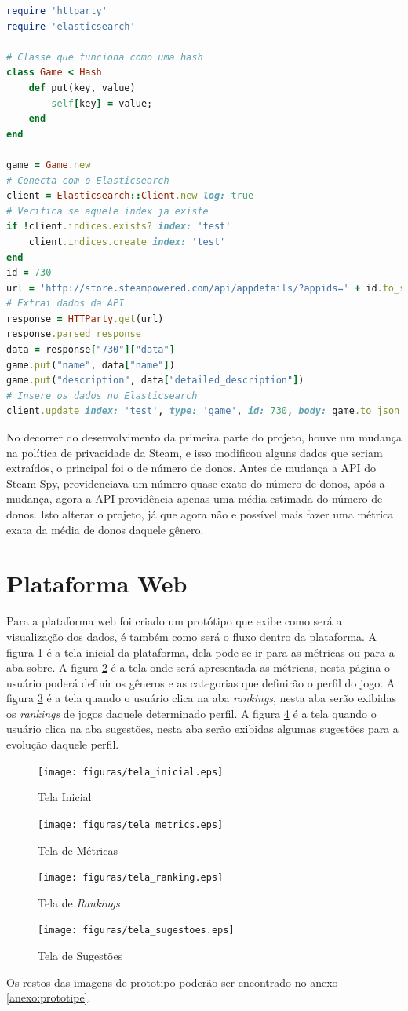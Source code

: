 \begin{lstlisting}[language={Ruby}, caption = {Código do \textit{Plugin}}, label = {code:plugin}]
require 'httparty'
require 'elasticsearch'

# Classe que funciona como uma hash
class Game < Hash
	def put(key, value)
		self[key] = value;
	end
end

game = Game.new
# Conecta com o Elasticsearch
client = Elasticsearch::Client.new log: true
# Verifica se aquele index ja existe
if !client.indices.exists? index: 'test'
	client.indices.create index: 'test'
end
id = 730
url = 'http://store.steampowered.com/api/appdetails/?appids=' + id.to_s
# Extrai dados da API
response = HTTParty.get(url)
response.parsed_response
data = response["730"]["data"]
game.put("name", data["name"])
game.put("description", data["detailed_description"])
# Insere os dados no Elasticsearch
client.update index: 'test', type: 'game', id: 730, body: game.to_json
\end{lstlisting}
No decorrer do desenvolvimento da primeira parte do projeto, houve um mudança na política de privacidade da Steam, e isso modificou alguns dados que seriam extraídos, o principal foi o de número de donos. Antes de mudança a API do Steam Spy, providenciava um número quase exato do número de donos, após a mudança, agora a API providência apenas uma média estimada do número de donos. Isto alterar o projeto, já que agora não e possível mais fazer uma métrica exata da média de donos daquele gênero.
\section{Plataforma Web}
Para a plataforma web foi criado um protótipo que exibe como será a visualização dos dados, é também como será o fluxo dentro da plataforma. A figura \ref{image:inicial} é a tela inicial da plataforma, dela pode-se ir para as métricas ou para a aba sobre. A figura \ref{image:metrics} é a tela onde será apresentada as métricas, nesta página o usuário poderá definir os gêneros e as categorias que definirão o perfil do jogo. A figura \ref{image:rankings} é a tela quando o usuário clica na aba \textit{rankings}, nesta aba serão exibidas os \textit{rankings} de jogos daquele determinado perfil. A figura \ref{image:sugestoes} é a tela quando o usuário clica na aba sugestões, nesta aba serão exibidas algumas sugestões para a evolução daquele perfil.
\begin{figure}
\centering
\texttt{[image: figuras/tela\_inicial.eps]}
\caption{Tela Inicial}
\label{image:inicial}
\end{figure}
\begin{figure}
\centering
\texttt{[image: figuras/tela\_metrics.eps]}
\caption{Tela de Métricas}
\label{image:metrics}
\end{figure}
\begin{figure}
\centering
\texttt{[image: figuras/tela\_ranking.eps]}
\caption{Tela de \textit{Rankings}}
\label{image:rankings}
\end{figure}
\begin{figure}
\centering
\texttt{[image: figuras/tela\_sugestoes.eps]}
\caption{Tela de Sugestões}
\label{image:sugestoes}
\end{figure}

Os restos das imagens de prototipo poderão ser encontrado no anexo \ref{anexo:prototipe}.